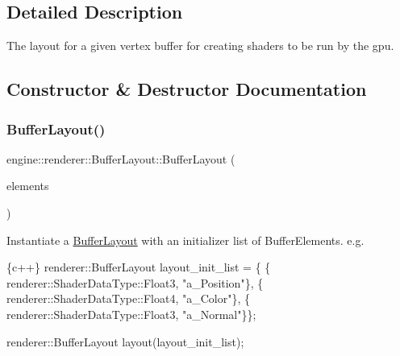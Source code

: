\subsection{Detailed Description}
The layout for a given vertex buffer for creating shaders to be run by the gpu. 

\subsection{Constructor \& Destructor Documentation}
\mbox{\label{classengine_1_1renderer_1_1BufferLayout_aad7d69ca7a55c528fd619bc2f51635f0}} 
\subsubsection{\texorpdfstring{Buffer\+Layout()}{BufferLayout()}\hspace{0.1cm}{\footnotesize\ttfamily [1/2]}}
{\footnotesize\ttfamily engine\+::renderer\+::\+Buffer\+Layout\+::\+Buffer\+Layout (\begin{DoxyParamCaption}\item[{const std\+::initializer\+\_\+list$<$ \hyperlink{structengine_1_1renderer_1_1BufferElement}{Buffer\+Element} $>$ \&}]{elements }\end{DoxyParamCaption})\hspace{0.3cm}{\ttfamily [inline]}}

Instantiate a \hyperlink{classengine_1_1renderer_1_1BufferLayout}{Buffer\+Layout} with an initializer list of Buffer\+Elements. e.\+g. 
\begin{DoxyCode}
\{c++\}
  renderer::BufferLayout layout\_init\_list = \{
      \{ renderer::ShaderDataType::Float3, \textcolor{stringliteral}{"a\_Position"}\},
      \{ renderer::ShaderDataType::Float4, \textcolor{stringliteral}{"a\_Color"}\},
      \{ renderer::ShaderDataType::Float3, \textcolor{stringliteral}{"a\_Normal"}\}\};

  renderer::BufferLayout layout(layout\_init\_list);
\end{DoxyCode}
 \mbox{\label{classengine_1_1renderer_1_1BufferLayout_ae2a3753096d6a8171179d6e9c86facb8}} 
